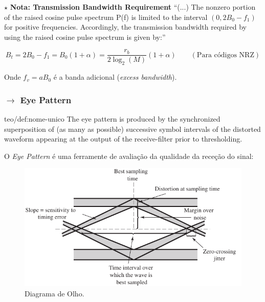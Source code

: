 \vspace{-1em}
{

\begin{mdframed}
    $\pmb{\star}$ \textbf{Nota: Transmission Bandwidth Requirement}
    \noindent``(...) The nonzero portion of the raised cosine pulse spectrum P(f) is limited to the interval $(0, 2B_0 - f_1)$ for positive frequencies. Accordingly, the transmission bandwidth required by using the raised cosine pulse spectrum is given by:''\cite{Haykin2007}
    
    $$
        B_t = 2B_0 - f_1 = B_0(1 + \alpha) = \boxed{\dfrac{r_b}{2\log_2(M)}(1 + \alpha)}\qquad (\text{Para códigos NRZ})
    $$

    \noindent Onde $f_v = aB_0$ é a banda adicional (\textit{excess bandwidth}).
\end{mdframed}
}
\clearpage
\subsubsection[3.4.3 Eye Pattern]{$\rightarrow$ Eye Pattern}
\label{subsec:EyePattern}

\begin{theo}{teo/def:nome-unico}\label{teo/def:eyePattern}
    The eye pattern is produced by the synchronized superposition of (as many as possible) successive symbol intervals of the distorted waveform appearing at the output of the receive-filter prior to thresholding.
\end{theo}

\noindent O \textit{Eye Pattern} é uma ferramente de avaliação da qualidade da receção do sinal:
\begin{figure}[H]
    \centering
    \includegraphics[width = 1\linewidth]{img/digital/ISI/EyePattern.png}
    \caption{Diagrama de Olho.}
    \label{fig:EyePattern}
\end{figure}
